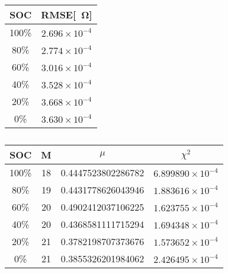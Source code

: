 
\begin{table}[h!]
\centering
\caption{}
\begin{tabular}{|c|c|}
\hline
\textbf{SOC} & \textbf{RMSE}[\SI{}{\ohm}] \\
\hline
100\% & $2.696 \times 10^{-4}$ \\
80\% & $2.774 \times 10^{-4}$ \\
60\% & $3.016 \times 10^{-4}$ \\
40\% & $3.528 \times 10^{-4}$ \\
20\% & $3.668 \times 10^{-4}$ \\
0\% & $3.630 \times 10^{-4}$ \\
\hline
\end{tabular}
\end{table}

\begin{table}[h!]
\centering
\caption{}
\begin{tabular}{|c|c|c|c|}
\hline
SOC & M & $\mu$ & $\chi^2$ \\
\hline
100\% & 18 & 0.4447523802286782 & $6.899890 \times 10^{-4}$ \\
80\% & 19 & 0.4431778626043946 & $1.883616 \times 10^{-4}$ \\
60\% & 20 & 0.4902412037106225 & $1.623755 \times 10^{-4}$ \\
40\% & 20 & 0.4368581111715294 & $1.694348 \times 10^{-4}$ \\
20\% & 21 & 0.3782198707373676 & $1.573652 \times 10^{-4}$ \\
0\% & 21 & 0.3855326201984062 & $2.426495 \times 10^{-4}$ \\
\hline
\end{tabular}
\end{table}

